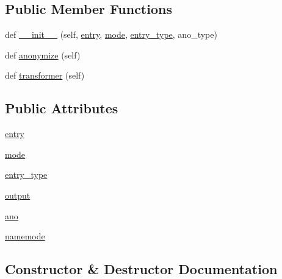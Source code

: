 \subsection*{Public Member Functions}
\begin{DoxyCompactItemize}
\item 
def \hyperlink{classparlai_1_1utils_1_1anonymizer_1_1Anonymizer_abb5227ee9a889aff79a0c657c76ffd71}{\+\_\+\+\_\+init\+\_\+\+\_\+} (self, \hyperlink{classparlai_1_1utils_1_1anonymizer_1_1Anonymizer_a348d1fd062fa3f57ad81cce32e8dd2c7}{entry}, \hyperlink{classparlai_1_1utils_1_1anonymizer_1_1Anonymizer_a535b959cd821885d5af2831644cde735}{mode}, \hyperlink{classparlai_1_1utils_1_1anonymizer_1_1Anonymizer_a11c56824a15faa979c46dde2422a4a78}{entry\+\_\+type}, ano\+\_\+type)
\item 
def \hyperlink{classparlai_1_1utils_1_1anonymizer_1_1Anonymizer_a4853ffad71c52d910e68752ee7a05200}{anonymize} (self)
\item 
def \hyperlink{classparlai_1_1utils_1_1anonymizer_1_1Anonymizer_a515fed7848150c353175b42ebe7d06c1}{transformer} (self)
\end{DoxyCompactItemize}
\subsection*{Public Attributes}
\begin{DoxyCompactItemize}
\item 
\hyperlink{classparlai_1_1utils_1_1anonymizer_1_1Anonymizer_a348d1fd062fa3f57ad81cce32e8dd2c7}{entry}
\item 
\hyperlink{classparlai_1_1utils_1_1anonymizer_1_1Anonymizer_a535b959cd821885d5af2831644cde735}{mode}
\item 
\hyperlink{classparlai_1_1utils_1_1anonymizer_1_1Anonymizer_a11c56824a15faa979c46dde2422a4a78}{entry\+\_\+type}
\item 
\hyperlink{classparlai_1_1utils_1_1anonymizer_1_1Anonymizer_a79c7f73d9f30bdf77d4274357272ca5e}{output}
\item 
\hyperlink{classparlai_1_1utils_1_1anonymizer_1_1Anonymizer_a93524d9b3d82d5cd637272cdf1dc816a}{ano}
\item 
\hyperlink{classparlai_1_1utils_1_1anonymizer_1_1Anonymizer_a1ebf22dc33a47f4a6f6a6833cdfe32f5}{namemode}
\end{DoxyCompactItemize}


\subsection{Constructor \& Destructor Documentation}
\mbox{\label{classparlai_1_1utils_1_1anonymizer_1_1Anonymizer_abb5227ee9a889aff79a0c657c76ffd71}} 
